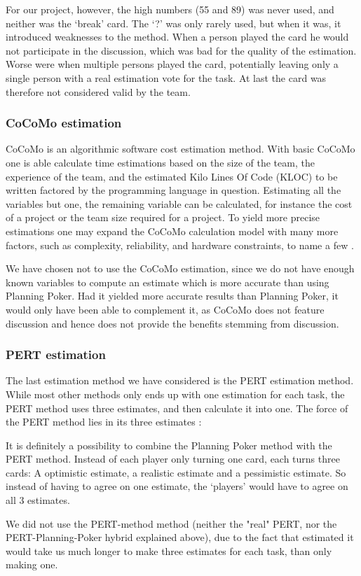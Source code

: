 For our project, however, the high numbers (55 and 89) was never used, and neither was the `break' card. The `?' was only rarely used, but when it was, it introduced weaknesses to the method.
When a person played the card he would not participate in the discussion, which was bad for the quality of the estimation. Worse were when multiple persons played the card, potentially leaving only a single person with a real estimation vote for the task.
At last the card was therefore not considered valid by the team.

\subsubsection{CoCoMo estimation}
CoCoMo is an algorithmic software cost estimation method. With basic CoCoMo one is able calculate time estimations based on the size of the team, the experience of the team, and the estimated Kilo Lines Of Code (KLOC) to be written factored by the programming language in question.
Estimating all the variables but one, the remaining variable can be calculated, for instance the cost of a project or the team size required for a project. To yield more precise estimations one may expand the CoCoMo calculation model with many more factors, such as complexity, reliability, and hardware constraints, to name a few \cite[p. 147]{PM}.

We have chosen not to use the CoCoMo estimation, since we do not have enough known variables to compute an estimate which is more accurate than using Planning Poker. Had it yielded more accurate results than Planning Poker, it would only have been able to complement it, as CoCoMo does not feature discussion and hence does not provide the benefits stemming from discussion.

\subsubsection{PERT estimation}
The last estimation method we have considered is the PERT estimation method. While most other methods only ends up with one estimation for each task, the PERT method uses three estimates, and then calculate it into one. The force of the PERT method lies in its three estimates \cite[p. 152]{PM}:

It is definitely a possibility to combine the Planning Poker method with the PERT method. Instead of each player only turning one card, each turns three cards: A optimistic estimate, a realistic estimate and a pessimistic estimate. So instead of having to agree on one estimate, the `players' would have to agree on all 3 estimates.

We did not use the PERT-method method (neither the "real" PERT, nor the PERT-Planning-Poker hybrid explained above), due to the fact that estimated it would take us much longer to make three estimates for each task, than only making one.